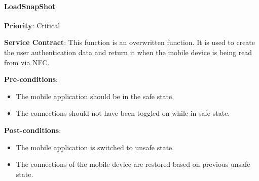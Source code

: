 	    \paragraph{LoadSnapShot}
			\begin{description}
			    \item{\textbf{Priority}:} Critical%
			    \item{\textbf{Service Contract}:} This function is an overwritten function. It is used to create the user authentication data and return it when the mobile device is being read from via NFC.%
			    \item{\textbf{Pre-conditions}:}%
    			    \begin{itemize}
    			        \item The mobile application should be in the safe state.
    			        \item The connections should not have been toggled on while in safe state.
  
    			    \end{itemize}
			    \item{\textbf{Post-conditions}:} %
    			    \begin{itemize}
    			    \item The mobile application is switched to unsafe state.
    			    \item The connections of the mobile device are restored based on previous unsafe state.

    			    \end{itemize}
			\end{description}	
			
				
